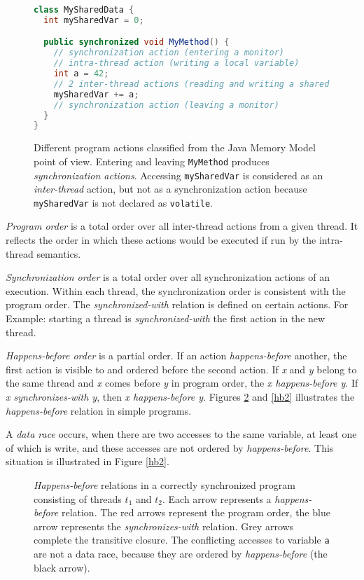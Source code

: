 \begin{figure}[hbt]
    \label{threadActions}
\begin{lstlisting}[language=java]
class MySharedData {
  int mySharedVar = 0;

  public synchronized void MyMethod() {
    // synchronization action (entering a monitor)
    // intra-thread action (writing a local variable)
    int a = 42;
    // 2 inter-thread actions (reading and writing a shared variable)
    mySharedVar += a;
    // synchronization action (leaving a monitor)
  }
}
\end{lstlisting}
    \caption{Different program actions classified from the Java Memory Model
    point of view. Entering and leaving \texttt{MyMethod} produces
    \emph{synchronization actions}. Accessing \texttt{mySharedVar} is considered
    as an \emph{inter-thread} action, but not as a synchronization action
    because \texttt{mySharedVar} is not declared as \texttt{volatile}.}
\end{figure}


\emph{Program order} is a total order over all inter-thread actions from a given
thread. It reflects the order in which these actions would be executed if
run by the intra-thread semantics.

\emph{Synchronization order} is a total order over all synchronization actions
of an execution. Within each thread, the synchronization order is consistent
with the program order. The \emph{synchronized-with} relation is defined on
certain actions. For Example: starting a thread is \emph{synchronized-with}
the first action in the new thread.

\emph{Happens-before order} is a partial order. If an action
\emph{happens-before} another, the first action is visible to and ordered before
the second action. If \emph{x} and \emph{y} belong to the same thread and
\emph{x} comes before \emph{y} in program order, the \emph{x happens-before y}.
If \emph{x synchronizes-with y}, then \emph{x happens-before y}. Figures
\ref{hb1} and \ref{hb2} illustrates the \emph{happens-before} relation in simple
programs.

A \emph{data race} occurs, when there are two accesses to the same variable, at
least one of which is write, and these accesses are not ordered by
\emph{happens-before}. This situation is illustrated in Figure \ref{hb2}.

\begin{figure}[hbt]
    \label{hb1}
    
    \caption{\emph{Happens-before} relations in a correctly synchronized program
    consisting of threads $t_1$ and $t_2$. Each arrow represents a
    \emph{happens-before} relation. The red arrows represent the program order,
    the blue arrow represents the \emph{synchronizes-with} relation. Grey arrows
    complete the transitive closure. The conflicting accesses to variable
    \texttt{a} are not a data race, because they are ordered by
    \emph{happens-before} (the black arrow).}
\end{figure}

